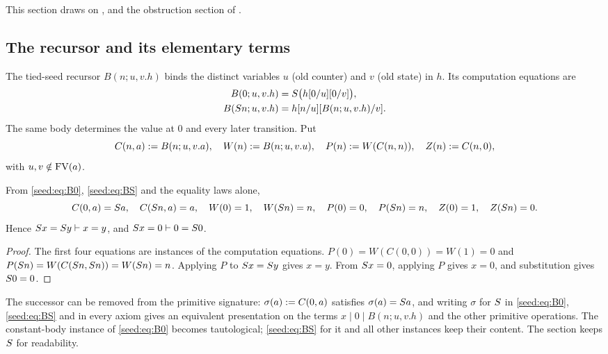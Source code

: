 This section draws on ,
 and the obstruction section of
.

\subsection{The recursor and its elementary terms}

\begin{definition}\label{seed:def:tied}
The tied-seed recursor $B(n;u,v.h)$ binds the distinct variables $u$ (old
counter) and $v$ (old state) in $h$. Its computation equations are
\begin{align}
 B(0;u,v.h)&=S\bigl(h[0/u][0/v]\bigr), \label{seed:eq:B0}\\
 B(S n;u,v.h)&=h[n/u][B(n;u,v.h)/v]. \label{seed:eq:BS}
\end{align}
The same body determines the value at $0$ and every later transition. Put
\[
 C(n,a)\mathrel{:=} B(n;u,v.a),\quad W(n)\mathrel{:=} B(n;u,v.u),\quad
 P(n)\mathrel{:=} W(C(n,n)),\quad Z(n)\mathrel{:=} C(n,0),
\]
with $u,v\notin\operatorname{FV}(a)$.
\end{definition}

\begin{lemma}\label{seed:lem:tied-macros}
From \eqref{seed:eq:B0}, \eqref{seed:eq:BS} and the equality laws alone,
\[
 C(0,a)=S a,\quad C(S n,a)=a,\quad W(0)=1,\quad W(S n)=n,\quad
 P(0)=0,\quad P(S n)=n,\quad Z(0)=1,\quad Z(S n)=0 .
\]
Hence $S x=S y\vdash x=y$, and $S x=0\vdash 0=S 0$.
\end{lemma}

\begin{proof}
The first four equations are instances of the computation equations.
$P(0)=W(C(0,0))=W(1)=0$ and $P(S n)=W(C(S n,S n))=W(S n)=n$.
Applying $P$ to $S x=S y$ gives $x=y$. From $S x=0$, applying $P$
gives $x=0$, and substitution gives $S 0=0$.
\end{proof}

The successor can be removed from the primitive signature: $\sigma(a)\mathrel{:=}
C(0,a)$ satisfies $\sigma(a)=S a$, and writing $\sigma$ for $S$ in
\eqref{seed:eq:B0}, \eqref{seed:eq:BS} and in every axiom gives an equivalent
presentation on the terms $x\mid0\mid B(n;u,v.h)$ and the other primitive
operations. The constant-body instance of \eqref{seed:eq:B0} becomes
tautological; \eqref{seed:eq:BS} for it and all other instances keep their
content. The section keeps $S$ for readability.

